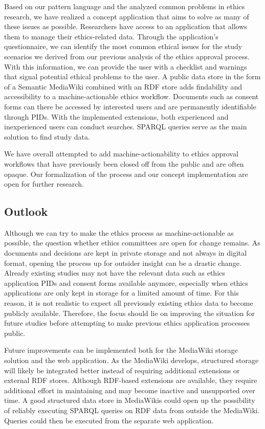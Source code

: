 \documentclass[10pt]{article}
\begin{document}
Based on our pattern language and the analyzed common problems in ethics research, we have realized a concept application that aims to solve as many of these issues as possible. Researchers have access to an application that allows them to manage their ethics-related data. Through the application's questionnaire, we can identify the most common ethical issues for the study scenarios we derived from our previous analysis of the ethics approval process. With this information, we can provide the user with a checklist and warnings that signal potential ethical problems to the user. A public data store in the form of a Semantic MediaWiki combined with an RDF store adds findability and accessibility to a machine-actionable ethics workflow. Documents such as consent forms can there be accessed by interested users and are permanently identifiable through PIDs. With the implemented extensions, both experienced and inexperienced users can conduct searches. SPARQL queries serve as the main solution to find study data.

We have overall attempted to add machine-actionability to ethics approval workflows that have previously been closed off from the public and are often opaque. Our formalization of the process and our concept implementation are open for further research.

\subsection{Outlook}
Although we can try to make the ethics process as machine-actionable as possible, the question whether ethics committees are open for change remains. As documents and decisions are kept in private storage and not always in digital format, opening the process up for outsider insight can be a drastic change. Already existing studies may not have the relevant data such as ethics application PIDs and consent forms available anymore, especially when ethics applications are only kept in storage for a limited amount of time. For this reason, it is not realistic to expect all previously existing ethics data to become publicly available. Therefore, the focus should lie on improving the situation for future studies before attempting to make previous ethics application processes public.

Future improvements can be implemented both for the MediaWiki storage solution and the web application. As the MediaWiki develops, structured storage will likely be integrated better instead of requiring additional extensions or external RDF stores. Although RDF-based extensions are available, they require additional effort in maintaining and may become inactive and unsupported over time. A good structured data store in MediaWikis could open up the possibility of reliably executing SPARQL queries on RDF data from outside the MediaWiki. Queries could then be executed from the separate web application.
\end{document}
